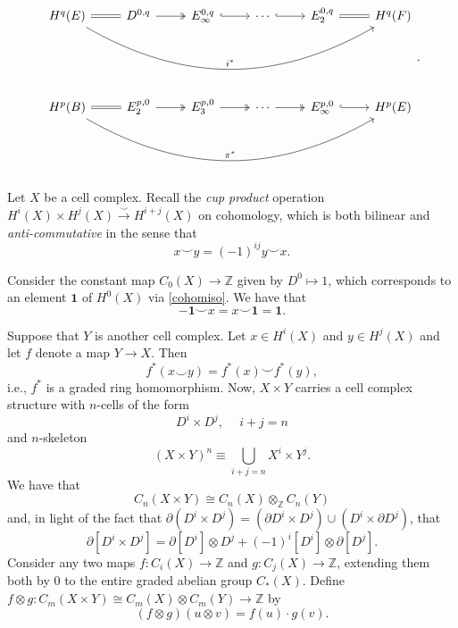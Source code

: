 \documentclass[10pt,letterpaper,cm]{nupset}
\theoremstyle{definition}
\theoremstyle{theorem}
\theoremstyle{remark}
\newcommand{\Z}{\mathbb Z}
\newcommand{\1}{\mathbb{1}}
\newcommand{\0}{\vec 0}
\begin{document}
\[
\begin{tikzcd}
H^q(E) \arrow[r, equals] \arrow[rrrrr, "i^{\ast}", bend right]   & {D^{0,q}} \arrow[r, two heads]   & {E_{\infty}^{0,q}} \arrow[r, hook] & \cdots \arrow[r, hook]      & {E_2^{0,q}} \arrow[r, equals]              & H^q(F) \\
                                                         &                                  &                                    &                             &                                    &        \\
                                                                                                                  &                                  &                                    &                             &                                    &        \\
H^p(B) \arrow[r, equals] \arrow[rrrrr, "\pi^{\ast}", bend right] & {E_2^{p,0}} \arrow[r, two heads] & {E_3^{p,0}} \arrow[r, two heads]   & \cdots \arrow[r, two heads] & {E_{\infty}^{p,0}} \arrow[r, hook] & H^p(E)
\end{tikzcd}.
\]

\bigskip

Let $X$ be a cell complex. Recall the \textit{cup product} operation $H^i(X) \times H^j(X) \overset{\smile }{\longrightarrow} H^{i+j}(X)$ on cohomology, which is both bilinear and \textit{anti-commutative} in the sense that
\[
x \smile y = ({-1})^{ij}y \smile x.
\]

Consider the constant map $C_0(X) \to \Z$ given by $D^0 \mapsto 1$, which corresponds to an element $\mathbf{1}$ of $H^0(X)$ via \cref{cohomiso}. We have that
\[
{-\mathbf{1}}\smile x = x \smile \mathbf{1} = \mathbf{1}.
\]

\smallskip

Suppose that $Y$ is another cell complex. Let $x \in H^i(X)$ and $y\in H^j(X)$ and let $f$ denote a map $Y \to X$. Then 
\[
f^{\ast}(x\smile y) =f^{\ast}(x)\smile f^{\ast}(y),
\] i.e., $f^{\ast}$ is a graded ring homomorphism. Now, $X \times Y$ carries a cell complex structure with $n$-cells of the form 
\[
D^i \times D^j, \  \quad i+j =n
\] and $n$-skeleton
\[
\left(X\times Y\right)^n \equiv \bigcup_{i+j =n}X^i \times Y^j.
\] We have that 
\[
C_n(X \times Y) \cong C_n(X) \otimes_{\Z} C_n(Y)
\] and, in light of the fact that $\partial(D^i \times D^j) = \left(\partial{D^i} \times D^j\right) \cup \left(D^i \times \partial{D^j}\right)$, that
\[
\partial[D^i \times D^j] = \partial[D^i] \otimes D^j + ({-1})^i[D^i]\otimes \partial[D^j].
\]
Consider any two maps $f: C_i(X) \to \Z$ and $g: C_j(X) \to \Z$, extending them both by $0$ to the entire graded abelian group $C_{\ast}(X)$. Define $f \otimes g : C_m(X \times Y)\cong C_m(X) \otimes C_m(Y) \to \Z$ by 
\[
\left(f \otimes g\right)\left(u \otimes v\right) = f(u) \cdot g(v).
\]
\end{document}
